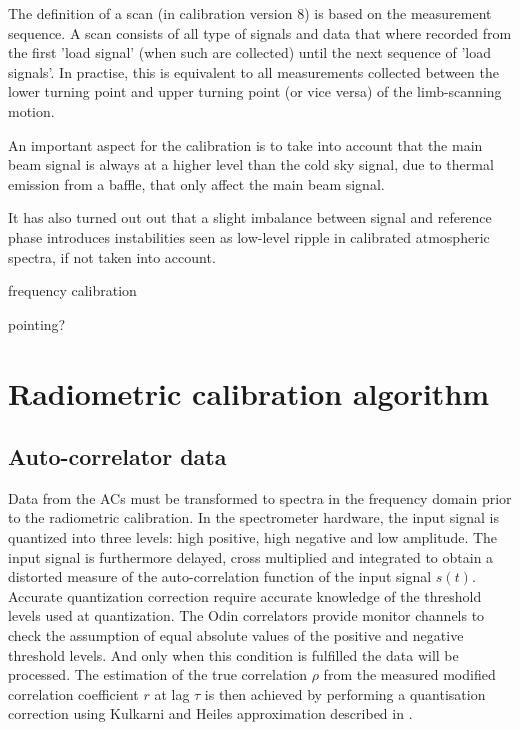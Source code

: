 The definition of a scan (in calibration version 8) is based
on the measurement sequence. A scan consists of all type of signals and data that
where recorded from the first 'load signal' (when such are collected) until the
next sequence of 'load signals'. In practise, this is equivalent to all 
measurements collected between the lower turning point and upper turning point
(or vice versa) of the limb-scanning motion.

An important aspect for the calibration is to take into account
that the main beam signal is always at a higher level than the cold sky signal,
due to thermal emission from a baffle, that only affect the main beam signal.

It has also turned out out that a slight imbalance between signal and 
reference phase introduces instabilities seen as low-level ripple 
in calibrated atmospheric spectra, if not taken into account. 

frequency calibration

pointing?







\section{Radiometric calibration algorithm}

\subsection{Auto-correlator data}

Data from the ACs must be transformed to spectra in the frequency domain
prior to the radiometric calibration. 
In the spectrometer hardware, the input signal is quantized into three levels: 
high positive, high negative and low amplitude. The input signal is furthermore delayed, 
cross multiplied and integrated to obtain a distorted measure of the auto-correlation function of the 
input signal \(s(t)\).
Accurate quantization correction require accurate knowledge of the threshold
levels used at quantization.
The Odin correlators provide monitor channels to check the
assumption of equal absolute values of the positive and negative threshold levels.
And only when this condition is fulfilled the data will be processed.
The estimation of the true correlation \(\rho\) from the measured modified correlation 
coefficient \(r\) at lag \(\tau\) is then achieved by performing a quantisation correction using 
Kulkarni and Heiles approximation described in \citet{ohlberg:theod:03}.

